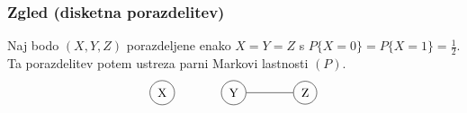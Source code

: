 \documentclass{beamer}
\begin{document}
\begin{frame}
    \frametitle{Zgled (disketna porazdelitev)}
    Naj bodo $(X,Y,Z)$ porazdeljene enako $X=Y=Z$ s $P\{X=0\} = P\{X=1\} = \frac{1}{2}. $
    Ta porazdelitev potem ustreza parni Markovi lastnosti $(P)$.\\
    \begin{align*}
        
    \begin{tikzpicture}
        \node[shape=circle,draw=black] (X) at (3,0) {X};
        \node[shape=circle,draw=black] (Y) at (5,0) {Y};
        \node[shape=circle,draw=black] (Z) at (7,0) {Z};
        \path [-] (Y) edge node[left] {} (Z);
    \end{tikzpicture}
    \end{align*}
\end{frame}
\end{document}
